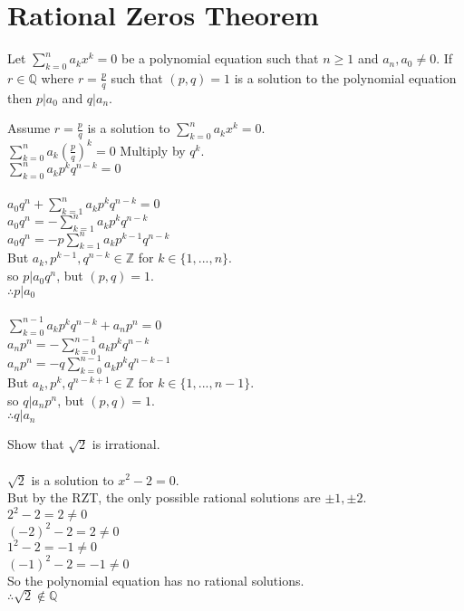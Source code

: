 \documentclass[letterpaper,12pt,fleqn]{article}
\begin{document}
\section*{Rational Zeros Theorem}

\begin{theorem}
Let $\sum_{k=0}^na_kx^k=0$ be a polynomial equation such that $n\ge1$ and
$a_n,a_0\ne0$. If $r\in\mathbb{Q}$ where $r=\frac{p}{q}$ such that $(p,q)=1$ is
a solution to the polynomial equation then $p|a_0$ and $q|a_n$.
\end{theorem}

\begin{theproof}
Assume $r=\frac{p}{q}$ is a solution to $\sum_{k=0}^na_kx^k=0$. \\
$\sum_{k=0}^na_k\left(\frac{p}{q}\right)^k=0$
Multiply by $q^k$. \\
$\sum_{k=0}^na_kp^kq^{n-k}=0$ \\
\\
$a_0q^n+\sum_{k=1}^na_kp^kq^{n-k}=0$ \\
$a_0q^n=-\sum_{k=1}^na_kp^kq^{n-k}$ \\
$a_0q^n=-p\sum_{k=1}^na_kp^{k-1}q^{n-k}$ \\
But $a_k, p^{k-1}, q^{n-k}\in\mathbb{Z}$ for $k\in\{1,...,n\}$. \\
so $p|a_0q^n$, but $(p,q)=1$. \\
$\therefore p|a_0$ \\
\\
$\sum_{k=0}^{n-1}a_kp^kq^{n-k}+a_np^n=0$ \\
$a_np^n=-\sum_{k=0}^{n-1}a_kp^kq^{n-k}$ \\
$a_np^n=-q\sum_{k=0}^{n-1}a_kp^kq^{n-k-1}$ \\
But $a_k, p^k, q^{n-k+1}\in\mathbb{Z}$ for $k\in\{1,...,n-1\}$. \\
so $q|a_np^n$, but $(p,q)=1$. \\
$\therefore q|a_n$ \\
\end{theproof}

\begin{example}
Show that $\sqrt{2}$ is irrational. \\
\\
$\sqrt{2}$ is a solution to $x^2-2=0$. \\
But by the RZT, the only possible rational solutions are $\pm1,\pm2$. \\
$2^2-2=2\ne0$ \\
$(-2)^2-2=2\ne0$ \\
$1^2-2=-1\ne0$ \\
$(-1)^2-2=-1\ne0$ \\
So the polynomial equation has no rational solutions. \\
$\therefore\sqrt{2}\notin\mathbb{Q}$
\end{example}
\end{document}
